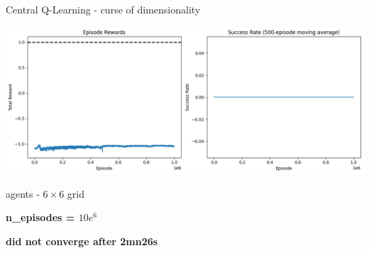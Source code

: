 \documentclass[aspectratio=169,xcolor=dvipsnames]{beamer}
\begin{document}
\begin{frame}{Central Q-Learning - curse of dimensionality}

\center
\includegraphics[scale=0.4]{images/4-agents-6x6-10e6.png}

\begin{minipage}{0.5\textwidth}
    \begin{block}{ agents - $6 \times 6$ grid} 
            \center
            \vspace{-10pt}
            \begin{inparaitem}
                \item \textbf{n\_episodes = $10e^6$}
                \item \textbf{\colorbox{lightred}{did not converge} after \textbf{2mn26s}}
            \end{inparaitem}  
    \end{block}
\end{minipage}

\end{frame}

\end{document}

